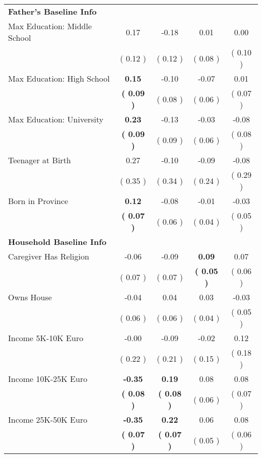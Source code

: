 \begin{table}[H]
{\begin{tabular}{lcccc}
\midrule
\textbf{Father's Baseline Info} \\
\quad Max Education: Middle School &      0.17 &     -0.18 &      0.01 &      0.00 \\
\quad  & (     0.12 ) & (     0.12 )  & (     0.08 )  & (     0.10 )  \\
\quad Max Education: High School & \textbf{     0.15} &     -0.10 &     -0.07 &      0.01 \\
\quad  & \textbf{(     0.09 )} & (     0.08 )  & (     0.06 )  & (     0.07 )  \\
\quad Max Education: University & \textbf{     0.23} &     -0.13 &     -0.03 &     -0.08 \\
\quad  & \textbf{(     0.09 )} & (     0.09 )  & (     0.06 )  & (     0.08 )  \\
\quad Teenager at Birth &      0.27 &     -0.10 &     -0.09 &     -0.08 \\
\quad  & (     0.35 ) & (     0.34 )  & (     0.24 )  & (     0.29 )  \\
\quad Born in Province & \textbf{     0.12} &     -0.08 &     -0.01 &     -0.03 \\
\quad  & \textbf{(     0.07 )} & (     0.06 )  & (     0.04 )  & (     0.05 )  \\
\midrule
\textbf{Household Baseline Info} \\
\quad Caregiver Has Religion &     -0.06 &     -0.09 & \textbf{     0.09} &      0.07 \\
\quad  & (     0.07 ) & (     0.07 )  & \textbf{(     0.05 )}  & (     0.06 )  \\
\quad Owns House &     -0.04 &      0.04 &      0.03 &     -0.03 \\
\quad  & (     0.06 ) & (     0.06 )  & (     0.04 )  & (     0.05 )  \\
\quad Income 5K-10K Euro &     -0.00 &     -0.09 &     -0.02 &      0.12 \\
\quad  & (     0.22 ) & (     0.21 )  & (     0.15 )  & (     0.18 )  \\
\quad Income 10K-25K Euro & \textbf{    -0.35} & \textbf{     0.19} &      0.08 &      0.08 \\
\quad  & \textbf{(     0.08 )} & \textbf{(     0.08 )}  & (     0.06 )  & (     0.07 )  \\
\quad Income 25K-50K Euro & \textbf{    -0.35} & \textbf{     0.22} &      0.06 &      0.08 \\
\quad  & \textbf{(     0.07 )} & \textbf{(     0.07 )}  & (     0.05 )  & (     0.06 )  \\

\end{tabular}}
\end{table}
